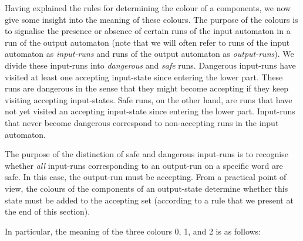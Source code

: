 
Having explained the rules for determining the colour of a components, we now give some insight into the meaning of these colours. The purpose of the colours is to signalise the presence or absence of certain runs of the input automaton  in a run of the output automaton (note that we will often refer to runs of the input automaton as \textit{input-runs} and runs of the output automaton as \textit{output-runs}). We divide these input-runs into \textit{dangerous} and \textit{safe} runs. Dangerous input-runs have visited at least one accepting input-state since entering the lower part. These runs are dangerous in the sense that they might become accepting if they keep visiting accepting input-states. Safe runs, on the other hand, are runs that have not yet visited an accepting input-state since entering the lower part. Input-runs that never become dangerous correspond to non-accepting runs in the input automaton.

The purpose of the distinction of safe and dangerous input-runs is to recognise whether \textit{all} input-runs corresponding to an output-run on a specific word are safe. In this case, the output-run must be accepting. From a practical point of view, the colours of the components of an output-state determine whether this state must be added to the accepting set (according to a rule that we present at the end of this section).

In particular, the meaning of the three colours 0, 1, and 2 is as follows:


